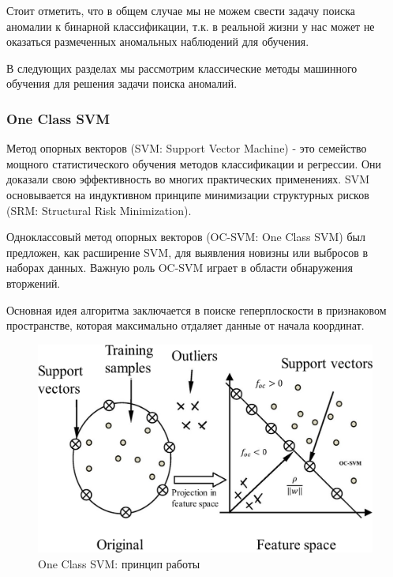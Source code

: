 \documentclass[12pt]{article}
\begin{document}
    \par Стоит отметить, что в общем случае мы не можем свести задачу поиска аномалии к бинарной классификации, т.к. в реальной жизни у нас может не оказаться размеченных аномальных наблюдений для обучения. \\

    \par В следующих разделах мы рассмотрим классические методы машинного обучения для решения задачи поиска аномалий.

    \newpage


    \subsubsection{One Class SVM}
    \label{sec:Research:Model:OneClassSVM}

    \par Метод опорных векторов (SVM: Support Vector Machine) - это семейство мощного статистического обучения методов классификации и регрессии. Они доказали свою эффективность во многих практических применениях. SVM основывается на индуктивном принципе минимизации структурных рисков (SRM: Structural Risk Minimization). \\

    \par Одноклассовый метод опорных векторов (OC-SVM: One Class SVM) был предложен, как расширение SVM, для выявления новизны или выбросов в наборах данных. Важную роль OC-SVM играет в области обнаружения вторжений. \\

    \par Основная идея алгоритма заключается в поиске геперплоскости в признаковом пространстве, которая максимально отдаляет данные от начала координат. \\

    \begin{figure}[h]
        \centering
        \includegraphics[width=0.5\linewidth]{OneClassSVM.png}
        \caption{One Class SVM: принцип работы}
        \label{sec:Research:Model:OneClassSVM:fig:OneClassSVM}
    \end{figure}
\end{document}

